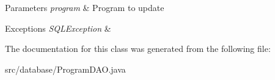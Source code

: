 \begin{DoxyParams}{Parameters}
{\em program} & Program to update \\
\hline
\end{DoxyParams}

\begin{DoxyExceptions}{Exceptions}
{\em S\-Q\-L\-Exception} & \\
\hline
\end{DoxyExceptions}


The documentation for this class was generated from the following file\-:\begin{DoxyCompactItemize}
\item 
src/database/Program\-D\-A\-O.\-java\end{DoxyCompactItemize}
